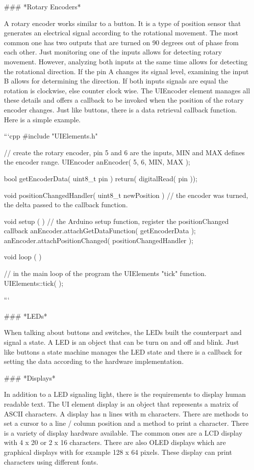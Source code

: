 ### *Rotary Encoders*

A rotary encoder works similar to a button. It is a type of position sensor that generates an electrical signal according to the rotational movement. The most common one has two outputs that are turned on 90 degrees out of phase from each other. Just monitoring one of the inputs allows for detecting rotary movement. However, analyzing both inputs at the same time allows for detecting the rotational direction. If the pin A changes its signal level, examining the input B allows for determining the direction. If both inputs signals are equal the rotation is clockwise, else counter clock wise. The UIEncoder element manages all these details and offers a callback to be invoked when the position of the rotary encoder changes. Just like buttons, there is a data retrieval callback function. Here is a simple example.

```cpp
#include "UIElements.h"

// create the rotary encoder, pin 5 and 6 are the inputs, MIN and MAX defines the encoder range.
UIEncoder anEncoder( 5, 6, MIN, MAX );

bool getEncoderData( uint8_t pin ) {
	return( digitalRead( pin ));
}

void positionChangedHandler( uint8_t newPosition ) {
	// the encoder was turned, the delta passed to the callback function.
}

void setup ( ) {
	// the Arduino setup function, register the positionChanged callback
	anEncoder.attachGetDataFunction( getEncoderData );
    anEncoder.attachPositionChanged( positionChangedHandler );
}

void loop ( ) {

    // in the main loop of the program the UIElements "tick" function.
	UIElements::tick( );
}
```

### *LEDs*

When talking about buttons and switches, the LEDs built the counterpart and signal a state. A LED is an object that can be turn on and off and blink. Just like buttons a state machine manages the LED state and there is a callback for setting the data according to the hardware implementation.

### *Displays*

In addition to a LED signaling light, there is the requirements to display human readable text. The UI element display is an object that represents a matrix of ASCII characters. A display has n lines with m characters. There are methods to set a cursor to a line / column position and a method to print a character. There is a variety of display hardware available. The common ones are a LCD display with 4 x 20 or 2 x 16 characters. There are also OLED displays which are graphical displays with for example 128 x 64 pixels. These display can print characters using different fonts.

